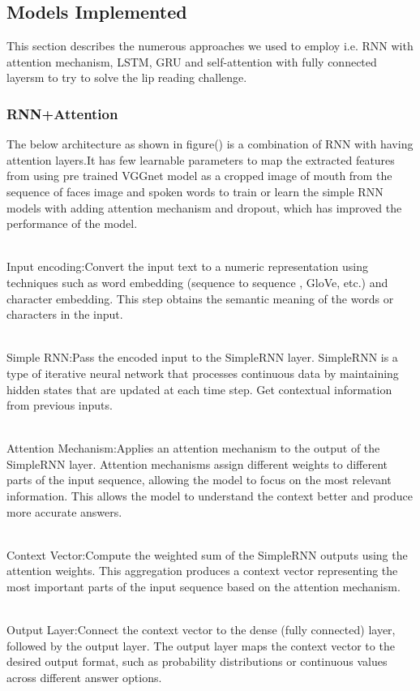 \documentclass[conference]{IEEEtran}
\begin{document}
\subsection{Models Implemented}
This section describes the numerous approaches we used to employ i.e. RNN with attention mechanism, LSTM, GRU and self-attention with fully connected layersm to try to solve the lip reading challenge. 
\subsubsection{RNN+Attention}
The below architecture as shown in figure() is a combination of RNN with having attention layers.It has few learnable parameters to map the extracted features from using pre trained VGGnet model as a cropped image of mouth from the sequence of faces image and spoken words to train or learn the simple RNN models with adding attention mechanism and dropout, which has improved the performance of the model.

\\ Input encoding:Convert the input text to a numeric representation using techniques such as word embedding (sequence to sequence , GloVe, etc.) and character embedding. This step obtains the semantic meaning of the words or characters in the input.

\\ Simple RNN:Pass the encoded input to the SimpleRNN layer. SimpleRNN is a type of iterative neural network that processes continuous data by maintaining hidden states that are updated at each time step. Get contextual information from previous inputs. 

\\ Attention Mechanism:Applies an attention mechanism to the output of the SimpleRNN layer. Attention mechanisms assign different weights to different parts of the input sequence, allowing the model to focus on the most relevant information. This allows the model to understand the context better and produce more accurate answers.

\\ Context Vector:Compute the weighted sum of the SimpleRNN outputs using the attention weights. This aggregation produces a context vector representing the most important parts of the input sequence based on the attention mechanism. 

\\ Output Layer:Connect the context vector to the dense (fully connected) layer, followed by the output layer. The output layer maps the context vector to the desired output format, such as probability distributions or continuous values across different answer options.
\end{document}
